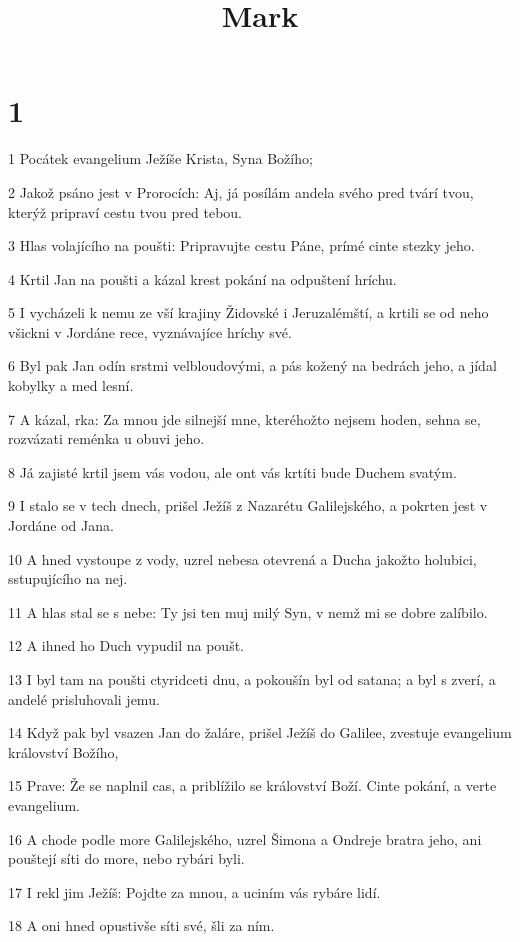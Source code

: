 

\title{Mark}

\chapter{1}

\par 1 Pocátek evangelium Ježíše Krista, Syna Božího;
\par 2 Jakož psáno jest v Prorocích: Aj, já posílám andela svého pred tvárí tvou, kterýž pripraví cestu tvou pred tebou.
\par 3 Hlas volajícího na poušti: Pripravujte cestu Páne, prímé cinte stezky jeho.
\par 4 Krtil Jan na poušti a kázal krest pokání na odpuštení hríchu.
\par 5 I vycházeli k nemu ze vší krajiny Židovské i Jeruzalémští, a krtili se od neho všickni v Jordáne rece, vyznávajíce hríchy své.
\par 6 Byl pak Jan odín srstmi velbloudovými, a pás kožený na bedrách jeho, a jídal kobylky a med lesní.
\par 7 A kázal, rka: Za mnou jde silnejší mne, kteréhožto nejsem hoden, sehna se, rozvázati reménka u obuvi jeho.
\par 8 Já zajisté krtil jsem vás vodou, ale ont vás krtíti bude Duchem svatým.
\par 9 I stalo se v tech dnech, prišel Ježíš z Nazarétu Galilejského, a pokrten jest v Jordáne od Jana.
\par 10 A hned vystoupe z vody, uzrel nebesa otevrená a Ducha jakožto holubici, sstupujícího na nej.
\par 11 A hlas stal se s nebe: Ty jsi ten muj milý Syn, v nemž mi se dobre zalíbilo.
\par 12 A ihned ho Duch vypudil na poušt.
\par 13 I byl tam na poušti ctyridceti dnu, a pokoušín byl od satana; a byl s zverí, a andelé prisluhovali jemu.
\par 14 Když pak byl vsazen Jan do žaláre, prišel Ježíš do Galilee, zvestuje evangelium království Božího,
\par 15 Prave: Že se naplnil cas, a priblížilo se království Boží. Cinte pokání, a verte evangelium.
\par 16 A chode podle more Galilejského, uzrel Šimona a Ondreje bratra jeho, ani pouštejí síti do more, nebo rybári byli.
\par 17 I rekl jim Ježíš: Pojdte za mnou, a uciním vás rybáre lidí.
\par 18 A oni hned opustivše síti své, šli za ním.
